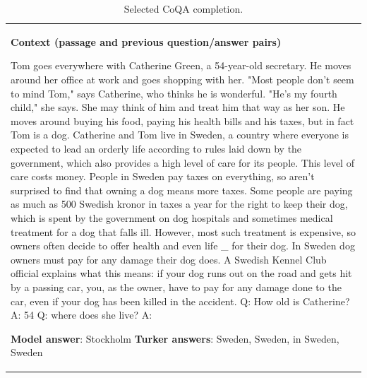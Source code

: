 \documentclass{article}
\begin{document}
\begin{table}[t]
\begin{center}
\begin{tabular}{|p{16cm}|}
\hline
\newline\vspace{3}
\textbf{Context (passage and previous question/answer pairs)} \newline

Tom goes everywhere with Catherine Green, a 54-year-old secretary. He moves around her office at work and goes shopping with her. "Most people don't seem to mind Tom," says Catherine, who thinks he is wonderful. "He's my fourth child," she says. She may think of him and treat him that way as her son. He moves around buying his food, paying his health bills and his taxes, but in fact Tom is a dog.
\newline\newline
Catherine and Tom live in Sweden, a country where everyone is expected to lead an orderly life according to rules laid down by the government, which also provides a high level of care for its people. This level of care costs money.
\newline\newline
People in Sweden pay taxes on everything, so aren't surprised to find that owning a dog means more taxes. Some people are paying as much as 500 Swedish kronor in taxes a year for the right to keep their dog, which is spent by the government on dog hospitals and sometimes medical treatment for a dog that falls ill. However, most such treatment is expensive, so owners often decide to offer health and even life \_ for their dog.
\newline\newline
In Sweden dog owners must pay for any damage their dog does. A Swedish Kennel Club official explains what this means: if your dog runs out on the road and gets hit by a passing car, you, as the owner, have to pay for any damage done to the car, even if your dog has been killed in the accident.
\newline\newline
Q: How old is Catherine?
\newline
A: 54
\newline\newline
Q: where does she live?
\newline
A:

\phantom \newline\newline

\textbf{Model answer}: Stockholm \newline
\textbf{Turker answers}: Sweden, Sweden, in Sweden, Sweden

\cline{1-14}

\end{tabular}
\caption{
Selected CoQA completion.
}
\label{coqa2}
\end{center}
\end{table}
\end{document}
